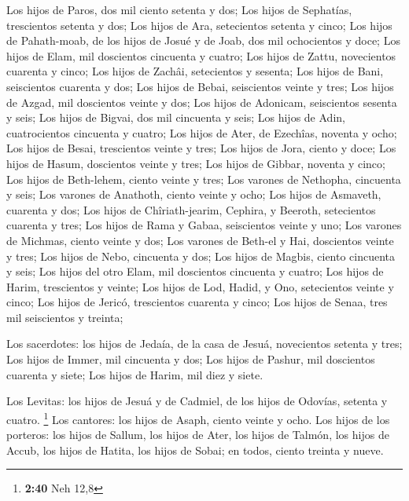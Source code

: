  Los hijos de Paros, dos mil ciento setenta y dos;
 Los hijos de Sephatías, trescientos setenta y dos;
 Los hijos de Ara, setecientos setenta y cinco; 
Los hijos de Pahath-moab, de los hijos de Josué y de Joab, dos mil
ochocientos y doce;  Los hijos de Elam, mil doscientos
cincuenta y cuatro;  Los hijos de Zattu, novecientos
cuarenta y cinco;  Los hijos de Zachâi, setecientos y
sesenta;  Los hijos de Bani, seiscientos cuarenta y dos;
 Los hijos de Bebai, seiscientos veinte y tres;
 Los hijos de Azgad, mil doscientos veinte y dos;
 Los hijos de Adonicam, seiscientos sesenta y seis;
 Los hijos de Bigvai, dos mil cincuenta y seis;
 Los hijos de Adin, cuatrocientos cincuenta y cuatro;
 Los hijos de Ater, de Ezechîas, noventa y ocho;
 Los hijos de Besai, trescientos veinte y tres;
 Los hijos de Jora, ciento y doce;  Los hijos
de Hasum, doscientos veinte y tres;  Los hijos de Gibbar,
noventa y cinco;  Los hijos de Beth-lehem, ciento veinte y
tres;  Los varones de Nethopha, cincuenta y seis;
 Los varones de Anathoth, ciento veinte y ocho;
 Los hijos de Asmaveth, cuarenta y dos;  Los
hijos de Chîriath-jearim, Cephira, y Beeroth, setecientos cuarenta y
tres;  Los hijos de Rama y Gabaa, seiscientos veinte y uno;
 Los varones de Michmas, ciento veinte y dos; 
Los varones de Beth-el y Hai, doscientos veinte y tres; 
Los hijos de Nebo, cincuenta y dos;  Los hijos de Magbis,
ciento cincuenta y seis;  Los hijos del otro Elam, mil
doscientos cincuenta y cuatro;  Los hijos de Harim,
trescientos y veinte;  Los hijos de Lod, Hadid, y Ono,
setecientos veinte y cinco;  Los hijos de Jericó,
trescientos cuarenta y cinco;  Los hijos de Senaa, tres mil
seiscientos y treinta;

 Los sacerdotes: los hijos de Jedaía, de la casa de Jesuá,
novecientos setenta y tres;  Los hijos de Immer, mil
cincuenta y dos;  Los hijos de Pashur, mil doscientos
cuarenta y siete;  Los hijos de Harim, mil diez y siete.

 Los Levitas: los hijos de Jesuá y de Cadmiel, de los hijos
de Odovías, setenta y cuatro. \footnote{\textbf{2:40} Neh 12,8}
 Los cantores: los hijos de Asaph, ciento veinte y ocho.
 Los hijos de los porteros: los hijos de Sallum, los hijos
de Ater, los hijos de Talmón, los hijos de Accub, los hijos de Hatita,
los hijos de Sobai; en todos, ciento treinta y nueve.

